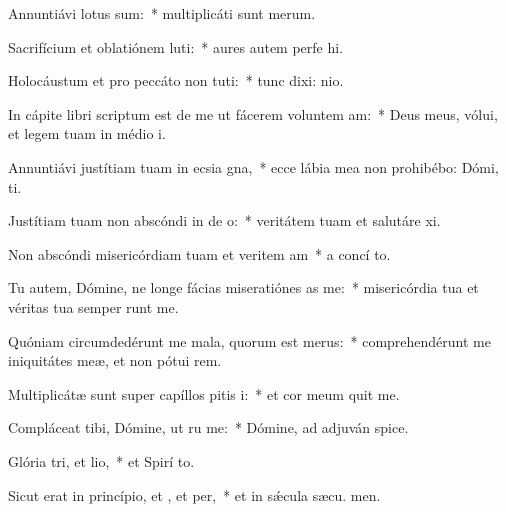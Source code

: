 \item Annuntiávi  lotus sum:~* multiplicáti sunt  merum.
\item Sacrifícium et oblatiónem luti:~* aures autem perfe hi.
\item Holocáustum et pro peccáto non tuti:~* tunc dixi:  nio.
\item In cápite libri scriptum est de me ut fácerem voluntem am:~* Deus meus, vólui, et legem tuam in médio  i.
\item Annuntiávi justítiam tuam in ecsia gna,~* ecce lábia mea non prohibébo: Dómi,  ti.
\item Justítiam tuam non abscóndi in de o:~* veritátem tuam et salutáre  xi.
\item Non abscóndi misericórdiam tuam et veritem am~* a concí to.
\item Tu autem, Dómine, ne longe fácias miseratiónes as  me:~* misericórdia tua et véritas tua semper runt me.
\item Quóniam circumdedérunt me mala, quorum  est merus:~* comprehendérunt me iniquitátes meæ, et non pótui  rem.
\item Multiplicátæ sunt super capíllos pitis i:~* et cor meum quit me.
\item Compláceat tibi, Dómine, ut ru me:~* Dómine, ad adjuván  spice.
\item Glória tri, et lio,~* et Spirí to.
\item Sicut erat in princípio, et , et per,~* et in sǽcula sæcu. men.
